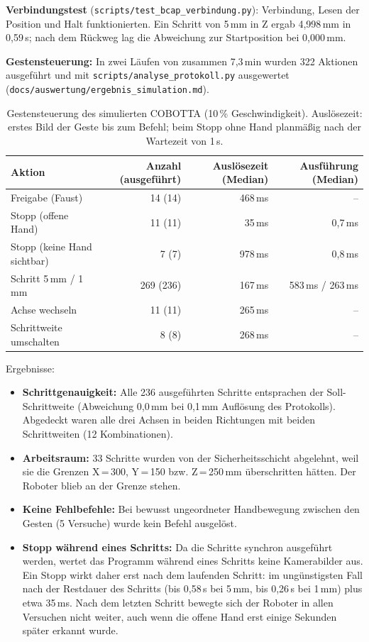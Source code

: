 \documentclass[11pt,a4paper]{article}
\newcommand{\datei}[1]{\texttt{#1}}
\begin{document}
\textbf{Verbindungstest} (\datei{scripts/test\_bcap\_verbindung.py}): Verbindung, Lesen der
Position und Halt funktionierten. Ein Schritt von 5\,mm in Z ergab 4,998\,mm in 0,59\,s; nach dem
Rückweg lag die Abweichung zur Startposition bei 0,000\,mm.

\textbf{Gestensteuerung:} In zwei Läufen von zusammen 7,3\,min wurden 322 Aktionen ausgeführt und
mit \datei{scripts/analyse\_protokoll.py} ausgewertet (\datei{docs/auswertung/ergebnis\_simulation.md}).

\begin{table}[H]
\centering
\small
\begin{tabular}{lrrr}
\toprule
Aktion & Anzahl (ausgeführt) & Auslösezeit (Median) & Ausführung (Median) \\
\midrule
Freigabe (Faust) & 14 (14) & 468\,ms & -- \\
Stopp (offene Hand) & 11 (11) & 35\,ms & 0,7\,ms \\
Stopp (keine Hand sichtbar) & 7 (7) & 978\,ms & 0,8\,ms \\
Schritt 5\,mm / 1\,mm & 269 (236) & 167\,ms & 583\,ms / 263\,ms \\
Achse wechseln & 11 (11) & 265\,ms & -- \\
Schrittweite umschalten & 8 (8) & 268\,ms & -- \\
\bottomrule
\end{tabular}
\caption{Gestensteuerung des simulierten COBOTTA (10\,\% Geschwindigkeit). Auslösezeit: erstes Bild
der Geste bis zum Befehl; beim Stopp ohne Hand planmäßig nach der Wartezeit von 1\,s.}
\label{tab:simulation}
\end{table}

Ergebnisse:
\begin{itemize}
  \item \textbf{Schrittgenauigkeit:} Alle 236 ausgeführten Schritte entsprachen der Soll-Schrittweite
        (Abweichung 0,0\,mm bei 0,1\,mm Auflösung des Protokolls). Abgedeckt waren alle drei Achsen in
        beiden Richtungen mit beiden Schrittweiten (12 Kombinationen).
  \item \textbf{Arbeitsraum:} 33 Schritte wurden von der Sicherheitsschicht abgelehnt, weil sie die
        Grenzen X\,=\,300, Y\,=\,150 bzw. Z\,=\,250\,mm überschritten hätten. Der Roboter blieb an der
        Grenze stehen.
  \item \textbf{Keine Fehlbefehle:} Bei bewusst ungeordneter Handbewegung zwischen den Gesten
        (5 Versuche) wurde kein Befehl ausgelöst.
  \item \textbf{Stopp während eines Schritts:} Da die Schritte synchron ausgeführt werden, wertet das
        Programm während eines Schritts keine Kamerabilder aus. Ein Stopp wirkt daher erst nach dem
        laufenden Schritt: im ungünstigsten Fall nach der Restdauer des Schritts (bis 0,58\,s bei
        5\,mm, bis 0,26\,s bei 1\,mm) plus etwa 35\,ms. Nach dem letzten Schritt bewegte sich der
        Roboter in allen Versuchen nicht weiter, auch wenn die offene Hand erst einige Sekunden später
        erkannt wurde.
\end{itemize}
\end{document}
